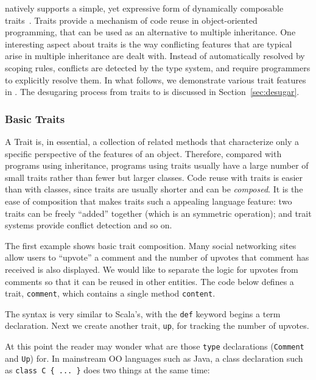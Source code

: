 \name natively supports a simple, yet expressive form of dynamically composable
traits~\cite{scharli2003traits}. Traits provide a mechanism of code reuse in
object-oriented programming, that can be used as an alternative to multiple
inheritance. One interesting aspect about traits is the way conflicting features
that are typical arise in multiple inheritance are dealt with. Instead of
automatically resolved by scoping rules, conflicts are detected by the type
system, and require programmers to explicitly resolve them. In what follows, we
demonstrate various trait features in \name. The desugaring process from traits
to \bname is discussed in Section~\ref{sec:desugar}.

\subsubsection{Basic Traits}

A Trait is, in essential, a collection of related methods that characterize only
a specific perspective of the features of an object. Therefore, compared with
programs using inheritance, programs using traits usually have a large number of
small traits rather than fewer but larger classes. Code reuse with traits is
easier than with classes, since traits are usually shorter and can be
\textit{composed}. It is the ease of composition that makes traits such a
appealing language feature: two traits can be freely ``added'' together (which
is an symmetric operation); and trait systems provide conflict detection and so
on.

The first example shows basic trait composition. Many social networking sites
allow users to ``upvote'' a comment and the number of upvotes that comment has
received is also displayed. We would like to separate the logic for upvotes from
comments so that it can be reused in other entities. The code below defines a
trait, \lstinline$comment$, which contains a single method \lstinline$content$.


The syntax is very similar to Scala's, with the \lstinline{def} keyword begins a
term declaration. Next we create another trait, \lstinline$up$, for tracking the
number of upvotes.


At this point the reader may wonder what are those \lstinline{type} declarations
(\lstinline$Comment$ and \lstinline$Up$) for. In mainstream OO languages such as
Java, a class declaration such as \lstinline$class C { ... }$ does two things at
the same time:

